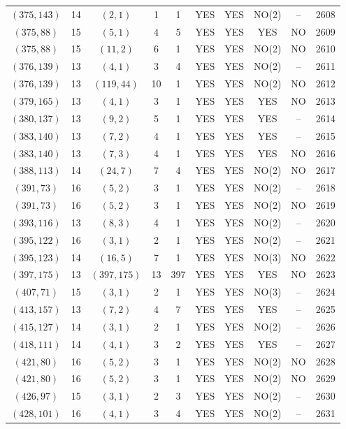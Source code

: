 \begin{longtable}{|c|c|c|c|c|c|c|c|c|c|}
$(375, 143)$ & 14 & $(2, 1)$ & 1 & 1 & YES & YES & NO(2) & -- & 2608\\
$(375, 88)$ & 15 & $(5, 1)$ & 4 & 5 & YES & YES & YES & NO & 2609\\
$(375, 88)$ & 15 & $(11, 2)$ & 6 & 1 & YES & YES & NO(2) & NO & 2610\\
$(376, 139)$ & 13 & $(4, 1)$ & 3 & 4 & YES & YES & NO(2) & -- & 2611\\
$(376, 139)$ & 13 & $(119, 44)$ & 10 & 1 & YES & YES & NO(2) & NO & 2612\\
$(379, 165)$ & 13 & $(4, 1)$ & 3 & 1 & YES & YES & YES & NO & 2613\\
$(380, 137)$ & 13 & $(9, 2)$ & 5 & 1 & YES & YES & YES & -- & 2614\\
$(383, 140)$ & 13 & $(7, 2)$ & 4 & 1 & YES & YES & YES & -- & 2615\\
$(383, 140)$ & 13 & $(7, 3)$ & 4 & 1 & YES & YES & YES & NO & 2616\\
$(388, 113)$ & 14 & $(24, 7)$ & 7 & 4 & YES & YES & NO(2) & NO & 2617\\
$(391, 73)$ & 16 & $(5, 2)$ & 3 & 1 & YES & YES & NO(2) & -- & 2618\\
$(391, 73)$ & 16 & $(5, 2)$ & 3 & 1 & YES & YES & NO(2) & NO & 2619\\
$(393, 116)$ & 13 & $(8, 3)$ & 4 & 1 & YES & YES & NO(2) & -- & 2620\\
$(395, 122)$ & 16 & $(3, 1)$ & 2 & 1 & YES & YES & NO(2) & -- & 2621\\
$(395, 123)$ & 14 & $(16, 5)$ & 7 & 1 & YES & YES & NO(3) & NO & 2622\\
$(397, 175)$ & 13 & $(397, 175)$ & 13 & 397 & YES & YES & YES & NO & 2623\\
$(407, 71)$ & 15 & $(3, 1)$ & 2 & 1 & YES & YES & NO(3) & -- & 2624\\
$(413, 157)$ & 13 & $(7, 2)$ & 4 & 7 & YES & YES & YES & -- & 2625\\
$(415, 127)$ & 14 & $(3, 1)$ & 2 & 1 & YES & YES & NO(2) & -- & 2626\\
$(418, 111)$ & 14 & $(4, 1)$ & 3 & 2 & YES & YES & YES & -- & 2627\\
$(421, 80)$ & 16 & $(5, 2)$ & 3 & 1 & YES & YES & NO(2) & NO & 2628\\
$(421, 80)$ & 16 & $(5, 2)$ & 3 & 1 & YES & YES & NO(2) & NO & 2629\\
$(426, 97)$ & 15 & $(3, 1)$ & 2 & 3 & YES & YES & NO(2) & -- & 2630\\
$(428, 101)$ & 16 & $(4, 1)$ & 3 & 4 & YES & YES & NO(2) & -- & 2631\\

\end{longtable}
